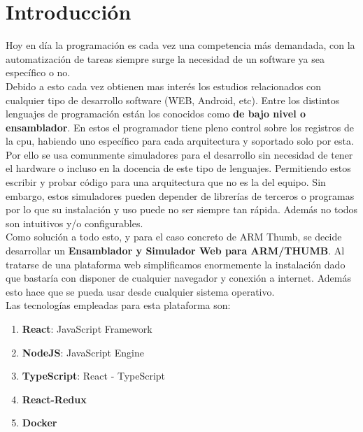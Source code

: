 \section{Introducción}
{
    Hoy en día la programación es cada vez una competencia más demandada, con la automatización de tareas siempre surge la necesidad de un software ya sea específico o no. \\

    Debido a esto cada vez obtienen mas interés los estudios relacionados con cualquier tipo de desarrollo software (WEB, Android, etc). Entre los distintos lenguajes de programación están los conocidos como \textbf{de bajo nivel o ensamblador}. En estos el programador tiene pleno control sobre los registros de la cpu, habiendo uno específico para cada arquitectura y soportado solo por esta. \\
    
    Por ello se usa comunmente simuladores para el desarrollo sin necesidad de tener el hardware o incluso en la docencia de este tipo de lenguajes. Permitiendo estos escribir y probar código para una arquitectura que no es la del equipo. Sin embargo, estos simuladores pueden depender de librerías de terceros o programas por lo que su instalación y uso puede no ser siempre tan rápida. Además no todos son intuitivos y/o configurables. \\
    
    Como solución a todo esto, y para el caso concreto de ARM Thumb, se decide desarrollar un \textbf{Ensamblador y Simulador Web para ARM/THUMB}. Al tratarse de una plataforma web simplificamos enormemente la instalación dado que bastaría con disponer de cualquier navegador y conexión a internet. Además esto hace que se pueda usar desde cualquier sistema operativo. \\

    Las tecnologías empleadas para esta plataforma son:
    \begin{enumerate}
        \item \textbf{React}: JavaScript Framework
        \item \textbf{NodeJS}: JavaScript Engine
        \item \textbf{TypeScript}: React - TypeScript
        \item \textbf{React-Redux}
        \item \textbf{Docker}
    \end{enumerate}
}

